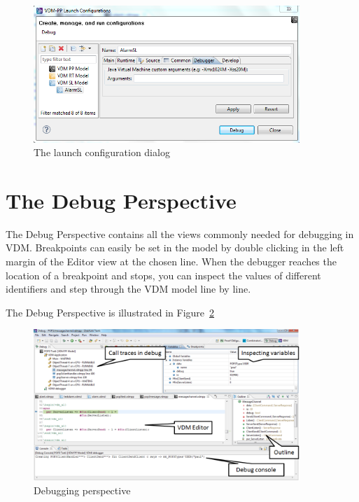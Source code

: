 \documentclass{overturerepchap}
\begin{document}
\begin{figure}[htp]
\begin{center}
  \includegraphics[width=380px]{screenDumps/launchconfigSpecialOptions}
  \caption{The launch configuration dialog}
  \label{fig:userguide:launchconfigSpecialOptions}
\end{center}
\end{figure}

\section{The Debug Perspective}

The Debug Perspective contains all the views
commonly needed for debugging in VDM. Breakpoints can easily be set in the
model by double clicking in the left margin of the Editor view at the chosen
line. When the debugger reaches the location of a breakpoint and stops, you can
inspect the values of different identifiers and step through the VDM model 
line by line.
 
The Debug Perspective is illustrated in Figure~\ref{fig:userguide:DebuggingVDM}

\begin{figure}[htp]
\begin{center}
  \includegraphics[width=380px]{figures/DebuggingVDM}
  \caption[Debugging perspective]{Debugging perspective}
  \label{fig:userguide:DebuggingVDM}
\end{center}
\end{figure}
\end{document}

